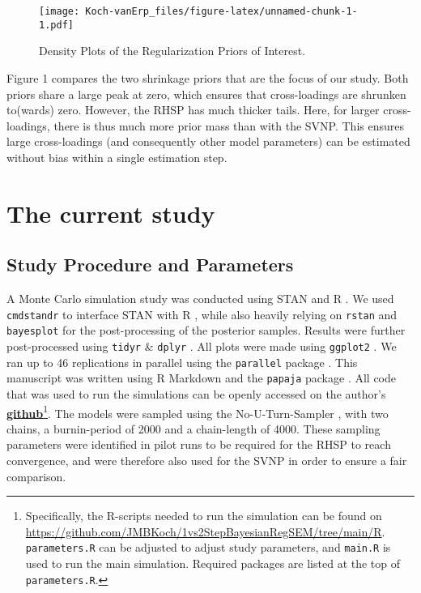 \documentclass[]{interact}
\theoremstyle{plain}%
\theoremstyle{definition}
\theoremstyle{remark}
\begin{document}
\begin{figure}
\centering
\texttt{[image: Koch-vanErp\_files/figure-latex/unnamed-chunk-1-1.pdf]}
\caption{Density Plots of the Regularization Priors of Interest.}
\end{figure}

Figure 1 compares the two shrinkage priors that are the focus of our
study. Both priors share a large peak at zero, which ensures that
cross-loadings are shrunken to(wards) zero. However, the RHSP has much
thicker tails. Here, for larger cross-loadings, there is thus much more
prior mass than with the SVNP. This ensures large cross-loadings (and
consequently other model parameters) can be estimated without bias
within a single estimation step.

\hypertarget{the-current-study}{%
\section{The current study}\label{the-current-study}}

\hypertarget{study-procedure-and-parameters}{%
\subsection{Study Procedure and
Parameters}\label{study-procedure-and-parameters}}

A Monte Carlo simulation study was conducted using STAN
\citep{stan_development_team_stan_2021} and R
\citep{r_core_team_r_2021}. We used \texttt{cmdstandr} to interface STAN
with R \citep{gabry_cmdstanr_2022}, while also heavily relying on
\texttt{rstan} \citep{stan_development_team_rstan_2022} and
\texttt{bayesplot} \citep{gabry_bayesplot_2022} for the post-processing
of the posterior samples. Results were further post-processed using
\texttt{tidyr} \citep{wickham_tidyr_2022} \& \texttt{dplyr}
\citep{wickham_dplyr_2022}. All plots were made using \texttt{ggplot2}
\citep{wickham_ggplot2_2016}. We ran up to 46 replications in parallel
using the \texttt{parallel} package \citep{r_core_team_package_2022}.
This manuscript was written using R Markdown and the \texttt{papaja}
package \citep{aust_papaja_2022}. All code that was used to run the
simulations can be openly accessed on the author's
\href{https://github.com/JMBKoch/1vs2StepBayesianRegSEM}{\textbf{github}}\footnote{Specifically,
  the R-scripts needed to run the simulation can be found on
  \url{https://github.com/JMBKoch/1vs2StepBayesianRegSEM/tree/main/R}.
  \texttt{parameters.R} can be adjusted to adjust study parameters, and
  \texttt{main.R} is used to run the main simulation. Required packages
  are listed at the top of \texttt{parameters.R}.}. The models were
sampled using the No-U-Turn-Sampler \citep{homan_no-u-turn_2014}, with
two chains, a burnin-period of 2000 and a chain-length of 4000. These
sampling parameters were identified in pilot runs to be required for the
RHSP to reach convergence, and were therefore also used for the SVNP in
order to ensure a fair comparison.
\end{document}
